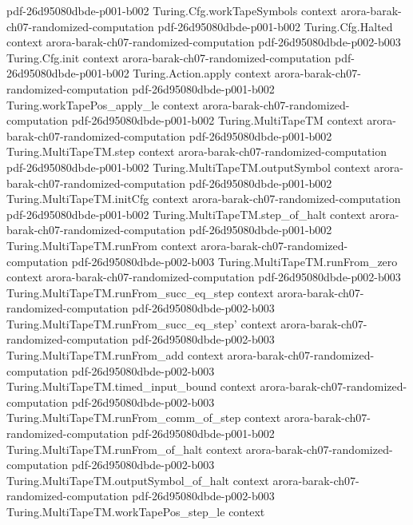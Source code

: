 \begin{theorem}
  {pdf-26d95080dbde-p001-b002}
\proofstep
  {Turing.Cfg.workTapeSymbols}
  {context}
  {arora-barak-ch07-randomized-computation}
  {pdf-26d95080dbde-p001-b002}
\proofstep
  {Turing.Cfg.Halted}
  {context}
  {arora-barak-ch07-randomized-computation}
  {pdf-26d95080dbde-p002-b003}
\proofstep
  {Turing.Cfg.init}
  {context}
  {arora-barak-ch07-randomized-computation}
  {pdf-26d95080dbde-p001-b002}
\proofstep
  {Turing.Action.apply}
  {context}
  {arora-barak-ch07-randomized-computation}
  {pdf-26d95080dbde-p001-b002}
\proofstep
  {Turing.workTapePos_apply_le}
  {context}
  {arora-barak-ch07-randomized-computation}
  {pdf-26d95080dbde-p001-b002}
\proofstep
  {Turing.MultiTapeTM}
  {context}
  {arora-barak-ch07-randomized-computation}
  {pdf-26d95080dbde-p001-b002}
\proofstep
  {Turing.MultiTapeTM.step}
  {context}
  {arora-barak-ch07-randomized-computation}
  {pdf-26d95080dbde-p001-b002}
\proofstep
  {Turing.MultiTapeTM.outputSymbol}
  {context}
  {arora-barak-ch07-randomized-computation}
  {pdf-26d95080dbde-p001-b002}
\proofstep
  {Turing.MultiTapeTM.initCfg}
  {context}
  {arora-barak-ch07-randomized-computation}
  {pdf-26d95080dbde-p001-b002}
\proofstep
  {Turing.MultiTapeTM.step_of_halt}
  {context}
  {arora-barak-ch07-randomized-computation}
  {pdf-26d95080dbde-p001-b002}
\proofstep
  {Turing.MultiTapeTM.runFrom}
  {context}
  {arora-barak-ch07-randomized-computation}
  {pdf-26d95080dbde-p002-b003}
\proofstep
  {Turing.MultiTapeTM.runFrom_zero}
  {context}
  {arora-barak-ch07-randomized-computation}
  {pdf-26d95080dbde-p002-b003}
\proofstep
  {Turing.MultiTapeTM.runFrom_succ_eq_step}
  {context}
  {arora-barak-ch07-randomized-computation}
  {pdf-26d95080dbde-p002-b003}
\proofstep
  {Turing.MultiTapeTM.runFrom_succ_eq_step'}
  {context}
  {arora-barak-ch07-randomized-computation}
  {pdf-26d95080dbde-p002-b003}
\proofstep
  {Turing.MultiTapeTM.runFrom_add}
  {context}
  {arora-barak-ch07-randomized-computation}
  {pdf-26d95080dbde-p002-b003}
\proofstep
  {Turing.MultiTapeTM.timed_input_bound}
  {context}
  {arora-barak-ch07-randomized-computation}
  {pdf-26d95080dbde-p002-b003}
\proofstep
  {Turing.MultiTapeTM.runFrom_comm_of_step}
  {context}
  {arora-barak-ch07-randomized-computation}
  {pdf-26d95080dbde-p001-b002}
\proofstep
  {Turing.MultiTapeTM.runFrom_of_halt}
  {context}
  {arora-barak-ch07-randomized-computation}
  {pdf-26d95080dbde-p002-b003}
\proofstep
  {Turing.MultiTapeTM.outputSymbol_of_halt}
  {context}
  {arora-barak-ch07-randomized-computation}
  {pdf-26d95080dbde-p002-b003}
\proofstep
  {Turing.MultiTapeTM.workTapePos_step_le}
  {context}

\end{theorem}
